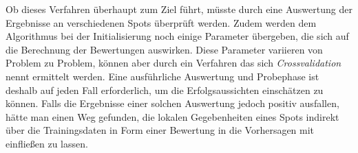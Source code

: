 Ob dieses Verfahren überhaupt zum Ziel führt, müsste durch eine
Auswertung der Ergebnisse an verschiedenen Spots überprüft
werden. Zudem werden dem Algorithmus bei der Initialisierung noch
einige Parameter übergeben, die sich auf die Berechnung der
Bewertungen auswirken. Diese Parameter variieren von Problem zu
Problem, können aber durch ein Verfahren das sich
\textit{Crossvalidation} nennt ermittelt werden. Eine ausführliche
Auswertung und Probephase ist deshalb auf jeden Fall erforderlich, um
die Erfolgsaussichten einschätzen zu können. Falls die Ergebnisse
einer solchen Auswertung jedoch positiv ausfallen, hätte man einen Weg
gefunden, die lokalen Gegebenheiten eines Spots indirekt über die
Trainingsdaten in Form einer Bewertung in die Vorhersagen mit
einfließen zu lassen.

